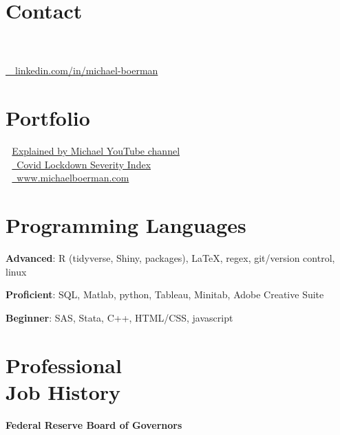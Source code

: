 \documentclass[margin,line]{res}
\begin{document}

\begin{resume}
\section{\sc Contact}

 \\
 \\
\faLinkedinIn  \href{https://www.linkedin.com/in/michael-boerman}{\ttfamily \, \, linkedin.com/in/michael-boerman}\\
\vspace{-.35cm}


\section{\sc Portfolio}
 \,\, \href{https://www.youtube.com/channel/UCxFMrMb6PrS7SOrQi-BfMUw/videos?view=0&sort=p&flow=grid}{ Explained by Michael YouTube channel}\\
\faChartLine \,\, \href{https://github.com/michaelboerman/lockdown_severity_index#readme}{\, Covid Lockdown Severity Index}\\
\faBriefcase \,\, \href{https://www.michaelboerman.com/}{\ttfamily  \, www.michaelboerman.com}\\
\vspace{-.35cm}

\section{\sc Programming Languages} 
{\bf Advanced}:  R (tidyverse, Shiny, packages), \LaTeX, regex, git/version control, linux
\vspace*{-3mm}

{\bf Proficient}: SQL, Matlab, python, Tableau, Minitab, Adobe Creative Suite
\vspace*{-3mm}

{\bf Beginner}:  SAS, Stata, C++, HTML/CSS, javascript

\section{\sc Professional \\ Job History}
{\bf Federal Reserve Board of Governors}\\


\end{resume}
\end{document}
